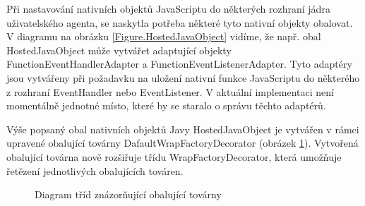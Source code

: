 Při nastavování nativních objektů JavaScriptu do některých rozhraní jádra uživatelského agenta, se naskytla potřeba některé tyto nativní objekty obalovat. V diagramu na obrázku \ref{Figure.HostedJavaObject} vidíme, že např. obal HostedJavaObject může vytvářet adaptující objekty FunctionEventHandlerAdapter a FunctionEventListenerAdapter. Tyto adaptéry jsou vytvářeny při požadavku na uložení nativní funkce JavaScriptu do některého z rozhraní EventHandler nebo EventListener. V aktuální implementaci není momentálně jednotné místo, které by se staralo o správu těchto adaptérů.

Výše popsaný obal nativních objektů Javy HostedJavaObject je vytvářen v rámci upravené obalující továrny DafaultWrapFactoryDecorator (obrázek \ref{Figure.WrapFactoryDecorator}). Vytvořená obalující továrna nově rozšiřuje třídu WrapFactoryDecorator, která umožňuje řetězení jednotlivých obalujících továren. 

\begin{figure}[H]
  \begin{center}
    \caption{Diagram tříd znázorňující obalující továrny}
    \label{Figure.WrapFactoryDecorator}
  \end{center}
\end{figure}

